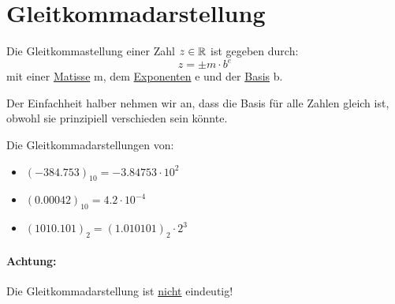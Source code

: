 \section{Gleitkommadarstellung}
\begin{definition}[Gleitkommadarstellung]
	Die Gleitkommastellung einer Zahl $z \in  \mathbb{R}$ ist gegeben durch:
	\[
	z=\pm m\cdot b^{e}
	\]
mit einer \underline{Matisse} m, dem \underline{Exponenten} e und der \underline{Basis} b.
\end{definition}
Der Einfachheit halber nehmen wir an, dass die Basis für alle Zahlen gleich ist, obwohl sie prinzipiell verschieden sein könnte.
\begin{example}
Die Gleitkommadarstellungen von:
\begin{itemize}
	\item $(-384.753)_{10}= -3.84753 \cdot 10^2$
	\item $(0.00042)_{10}=4.2 \cdot 10^{-4}$
	\item $(1010.101)_2= (1.010101)_2 \cdot 2^{3}$
\end{itemize}
\end{example}
\paragraph{Achtung:} Die Gleitkommadarstellung ist \underline{nicht} eindeutig!

